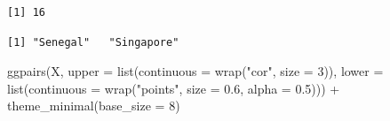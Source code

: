 \documentclass[oneside, openany, fontset=libertinus]{mitthesis}
\newenvironment{Shaded}{\begin{snugshade}}{\end{snugshade}}
\newcommand{\AttributeTok}[1]{\textcolor[rgb]{0.40,0.45,0.13}{#1}}
\newcommand{\DecValTok}[1]{\textcolor[rgb]{0.68,0.00,0.00}{#1}}
\newcommand{\FloatTok}[1]{\textcolor[rgb]{0.68,0.00,0.00}{#1}}
\newcommand{\FunctionTok}[1]{\textcolor[rgb]{0.28,0.35,0.67}{#1}}
\newcommand{\NormalTok}[1]{\textcolor[rgb]{0.00,0.23,0.31}{#1}}
\newcommand{\SpecialCharTok}[1]{\textcolor[rgb]{0.37,0.37,0.37}{#1}}
\newcommand{\StringTok}[1]{\textcolor[rgb]{0.13,0.47,0.30}{#1}}
\newenvironment{codres}%
  {\par\smallskip\noindent\begin{minipage}[t]{0.57\linewidth}\vspace{0pt}}%
  {\end{minipage}\par\medskip}
\newcommand{\codressep}{\end{minipage}\hfill\begin{minipage}[t]{0.40\linewidth}\vspace{0pt}}
\begin{document}
\Needspace{2.28in}

\begin{codres}

\begin{Shaded}
\end{Shaded}

\codressep

\begin{verbatim}
[1] 16
\end{verbatim}

\end{codres}

\begin{codres}

\begin{Shaded}
\end{Shaded}

\codressep

\begin{verbatim}
[1] "Senegal"   "Singapore"
\end{verbatim}

\end{codres}

\Needspace{7.06in}

\begin{Shaded}
\begin{Highlighting}[]
\FunctionTok{ggpairs}\NormalTok{(X, }\AttributeTok{upper =} \FunctionTok{list}\NormalTok{(}\AttributeTok{continuous =} \FunctionTok{wrap}\NormalTok{(}\StringTok{"cor"}\NormalTok{, }\AttributeTok{size =} \DecValTok{3}\NormalTok{)),}
        \AttributeTok{lower =} \FunctionTok{list}\NormalTok{(}\AttributeTok{continuous =} \FunctionTok{wrap}\NormalTok{(}\StringTok{"points"}\NormalTok{, }\AttributeTok{size =} \FloatTok{0.6}\NormalTok{,}
                                       \AttributeTok{alpha =} \FloatTok{0.5}\NormalTok{))) }\SpecialCharTok{+}
  \FunctionTok{theme\_minimal}\NormalTok{(}\AttributeTok{base\_size =} \DecValTok{8}\NormalTok{)}
\end{Highlighting}
\end{Shaded}
\end{document}
